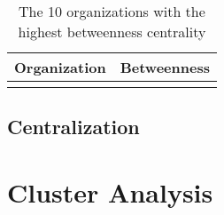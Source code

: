 \begin{table}
	\begin{tabular}{l|c}%
		\bfseries Organization & \bfseries Betweenness%
		\csvreader[head to column names]{betweenness.csv}{}%
		{\\\hline\organizationc & \scorec}%
	\end{tabular}
	\centering
	\caption{The 10 organizations with the highest betweenness centrality}\label{tab:betweenness}
\end{table}

\subsection{Centralization}
\section{Cluster Analysis}\label{clustersection}